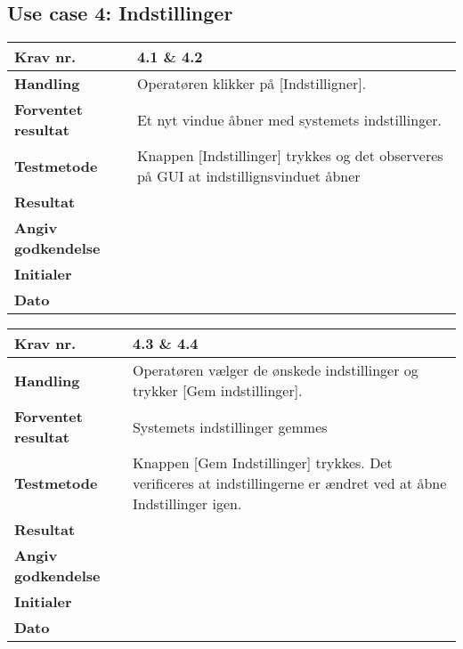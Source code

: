  \subsection{Use case 4: Indstillinger}

	\begin{center}
		\begin{longtable}{ | m{4cm}| m{8.5cm}|} 
			\hline
			\textbf{Krav nr.} & 4.1 \& 4.2  \\ 
			\hline
			\textbf{Handling} & Operatøren klikker på [Indstilligner].  \\
			\hline
			\textbf{Forventet resultat} & Et nyt vindue åbner med systemets indstillinger. \\
			\hline
			\textbf{Testmetode}  & Knappen [Indstillinger] trykkes og det observeres på GUI at indstillignsvinduet åbner \\
			\hline
			\textbf{Resultat}  &    \\
			\hline
			\textbf{Angiv godkendelse} &     \\
			\hline
			\textbf{Initialer} &     \\
			\hline
			\textbf{Dato} &    \\
			\hline
		\end{longtable}
	\end{center}		
			
	\begin{center}
		\begin{longtable}{ | m{4cm}| m{8.5cm}|} 
			\hline
			\textbf{Krav nr.} & 4.3 \& 4.4 \\ 
			\hline
			\textbf{Handling} & Operatøren vælger de ønskede indstillinger og trykker [Gem indstillinger].  \\
			\hline
			\textbf{Forventet resultat} & Systemets indstillinger gemmes  \\
			\hline
			\textbf{Testmetode}  & Knappen [Gem Indstillinger] trykkes. Det verificeres at indstillingerne er ændret ved at åbne Indstillinger igen.  \\
			\hline
			\textbf{Resultat}  &    \\
			\hline
			\textbf{Angiv godkendelse} &     \\
			\hline
			\textbf{Initialer} &     \\
			\hline
			\textbf{Dato} &    \\
			\hline
		\end{longtable}
	\end{center}

\newpage

